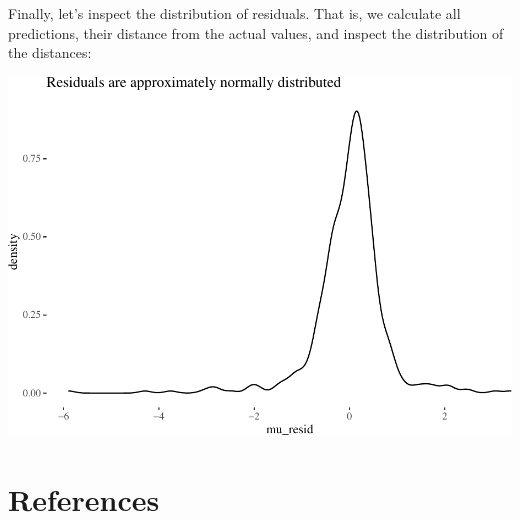 \documentclass[10pt,dvipsnames,enabledeprecatedfontcommands]{scrartcl}
\newenvironment{Shaded}{\begin{snugshade}}{\end{snugshade}}
\newcommand{\KeywordTok}[1]{\textcolor[rgb]{0.13,0.29,0.53}{\textbf{#1}}}
\newcommand{\DataTypeTok}[1]{\textcolor[rgb]{0.13,0.29,0.53}{#1}}
\newcommand{\DecValTok}[1]{\textcolor[rgb]{0.00,0.00,0.81}{#1}}
\newcommand{\StringTok}[1]{\textcolor[rgb]{0.31,0.60,0.02}{#1}}
\newcommand{\OperatorTok}[1]{\textcolor[rgb]{0.81,0.36,0.00}{\textbf{#1}}}
\newcommand{\NormalTok}[1]{#1}
\begin{document}
\normalsize

Finally, let's inspect the distribution of residuals. That is, we
calculate all predictions, their distance from the actual values, and
inspect the distribution of the distances:

\vspace{1mm} \footnotesize

\begin{Shaded}
\end{Shaded}

\begin{center}\includegraphics[width=1\linewidth]{bayesianReport_files/figure-latex/unnamed-chunk-9-1} \end{center}

\normalsize

\section*{References}\label{references}

\vspace{-3mm}
\end{document}
